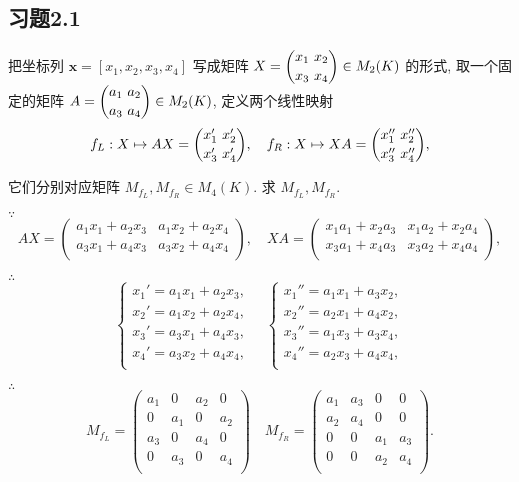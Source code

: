 \documentclass{ctexart}
\begin{document}
\subsection{习题2.1}
\begin{exercise}%
    把坐标列 $\boldsymbol{x}=[x_1,x_2,x_3,x_4]$ 写成矩阵 $X=\dbinom{x_1\ x_2}{x_3\ x_4}\in M_2(K)$ 的形式, 取一个固定的矩阵 $A=\dbinom{a_1\ a_2}{a_3\ a_4}\in M_2(K)$, 定义两个线性映射
    \[f_L:X\mapsto AX=\dbinom{x_1'\ x_2'}{x_3'\ x_4'},\quad f_R:X\mapsto XA=\dbinom{x_1''\ x_2''}{x_3''\ x_4''},\]

    它们分别对应矩阵 $M_{f_L},M_{f_R}\in M_4(K)$. 求 $M_{f_L},M_{f_R}$.
\end{exercise}
\begin{solution}
    $\because$
    \[AX=\begin{pmatrix}
        a_1x_1+a_2x_3 & a_1x_2+a_2x_4 \\
        a_3x_1+a_4x_3 & a_3x_2+a_4x_4 \\
    \end{pmatrix},\quad XA=\begin{pmatrix}
        x_1a_1+x_2a_3 & x_1a_2+x_2a_4 \\
        x_3a_1+x_4a_3 & x_3a_2+x_4a_4 \\
    \end{pmatrix},\]

    $\therefore$
    \[\begin{cases}
        x_1'=a_1x_1+a_2x_3, \\
        x_2'=a_1x_2+a_2x_4, \\
        x_3'=a_3x_1+a_4x_3, \\
        x_4'=a_3x_2+a_4x_4, \\
    \end{cases}\quad\begin{cases}
        x_1''=a_1x_1+a_3x_2, \\
        x_2''=a_2x_1+a_4x_2, \\
        x_3''=a_1x_3+a_3x_4, \\
        x_4''=a_2x_3+a_4x_4, \\
    \end{cases}\]

    $\therefore$
    \[M_{f_L}=\begin{pmatrix}
        a_1 & 0   & a_2 & 0   \\
        0   & a_1 & 0   & a_2 \\
        a_3 & 0   & a_4 & 0   \\
        0   & a_3 & 0   & a_4 \\
    \end{pmatrix}\quad M_{f_R}=\begin{pmatrix}
        a_1 & a_3 & 0   & 0   \\
        a_2 & a_4 & 0   & 0   \\
        0   & 0   & a_1 & a_3 \\
        0   & 0   & a_2 & a_4 \\
    \end{pmatrix}.\]
\end{solution}
\end{document}
